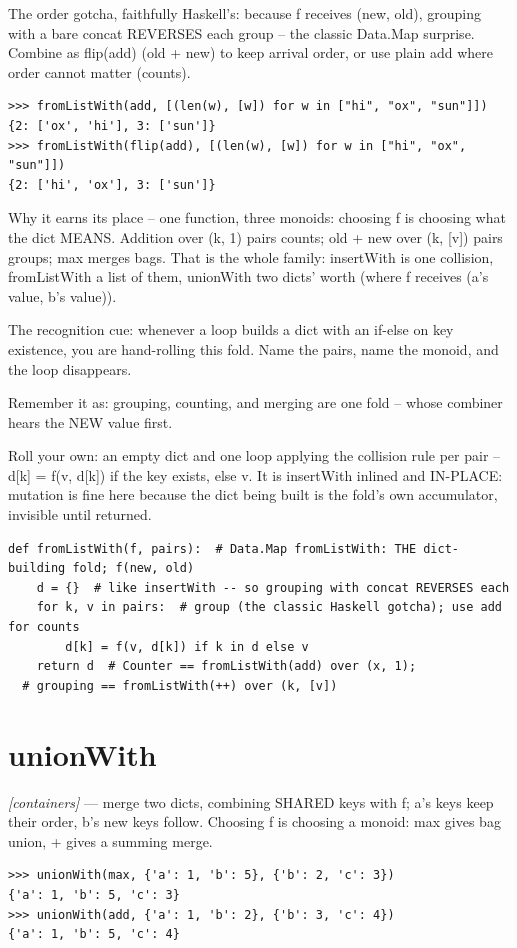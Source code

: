 \documentclass[11pt,letterpaper]{book}
\begin{document}
The order gotcha, faithfully Haskell's: because f receives (new, old), grouping with a bare concat REVERSES each group -- the classic Data.Map surprise. Combine as flip(add) (old + new) to keep arrival order, or use plain add where order cannot matter (counts).

\begin{lstlisting}[style=spec]
>>> fromListWith(add, [(len(w), [w]) for w in ["hi", "ox", "sun"]])
{2: ['ox', 'hi'], 3: ['sun']}
>>> fromListWith(flip(add), [(len(w), [w]) for w in ["hi", "ox", "sun"]])
{2: ['hi', 'ox'], 3: ['sun']}
\end{lstlisting}

Why it earns its place -- one function, three monoids: choosing f is choosing what the dict MEANS. Addition over (k, 1) pairs counts; old + new over (k, [v]) pairs groups; max merges bags. That is the whole family: insertWith is one collision, fromListWith a list of them, unionWith two dicts' worth (where f receives (a's value, b's value)).


The recognition cue: whenever a loop builds a dict with an if-else on key existence, you are hand-rolling this fold. Name the pairs, name the monoid, and the loop disappears.


Remember it as: grouping, counting, and merging are one fold -- whose combiner hears the NEW value first.


Roll your own: an empty dict and one loop applying the collision rule per pair -- d[k] = f(v, d[k]) if the key exists, else v. It is insertWith inlined and IN-PLACE: mutation is fine here because the dict being built is the fold's own accumulator, invisible until returned.

\begin{lstlisting}[style=code]
def fromListWith(f, pairs):  # Data.Map fromListWith: THE dict-building fold; f(new, old)
    d = {}  # like insertWith -- so grouping with concat REVERSES each
    for k, v in pairs:  # group (the classic Haskell gotcha); use add for counts
        d[k] = f(v, d[k]) if k in d else v
    return d  # Counter == fromListWith(add) over (x, 1);
  # grouping == fromListWith(++) over (k, [v])
\end{lstlisting}

\section{unionWith}
\noindent\textit{[containers]} --- merge two dicts, combining SHARED keys with f; a's keys keep their order, b's new keys follow. Choosing f is choosing a monoid: max gives bag union, + gives a summing merge.
\begin{lstlisting}[style=spec]
>>> unionWith(max, {'a': 1, 'b': 5}, {'b': 2, 'c': 3})
{'a': 1, 'b': 5, 'c': 3}
>>> unionWith(add, {'a': 1, 'b': 2}, {'b': 3, 'c': 4})
{'a': 1, 'b': 5, 'c': 4}
\end{lstlisting}
\end{document}
